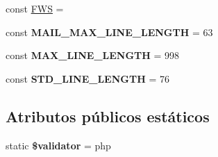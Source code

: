 \begin{DoxyCompactItemize}
const \hyperlink{classPHPMailer_1_1PHPMailer_1_1PHPMailer_aa1994a4703208136cea059f0d9c7b847}{F\+WS} = \textquotesingle{} \textquotesingle{}
\item 
\mbox{\label{classPHPMailer_1_1PHPMailer_1_1PHPMailer_aa77bbbfcd9e422de5ecdf38fa5d9c8ba}} 
const {\bfseries M\+A\+I\+L\+\_\+\+M\+A\+X\+\_\+\+L\+I\+N\+E\+\_\+\+L\+E\+N\+G\+TH} = 63
\item 
\mbox{\label{classPHPMailer_1_1PHPMailer_1_1PHPMailer_a35f7742eba8ce7f65782ef3575cbf472}} 
const {\bfseries M\+A\+X\+\_\+\+L\+I\+N\+E\+\_\+\+L\+E\+N\+G\+TH} = 998
\item 
\mbox{\label{classPHPMailer_1_1PHPMailer_1_1PHPMailer_abf7634fad6fbcfeec5aa10eb9ef36f7b}} 
const {\bfseries S\+T\+D\+\_\+\+L\+I\+N\+E\+\_\+\+L\+E\+N\+G\+TH} = 76
\end{DoxyCompactItemize}
\subsection*{Atributos públicos estáticos}
\begin{DoxyCompactItemize}
\item 
\mbox{\label{classPHPMailer_1_1PHPMailer_1_1PHPMailer_af119ac7b69e0efa3cd945f0658f60897}} 
static {\bfseries \$validator} = \textquotesingle{}php\textquotesingle{}
\end{DoxyCompactItemize}
